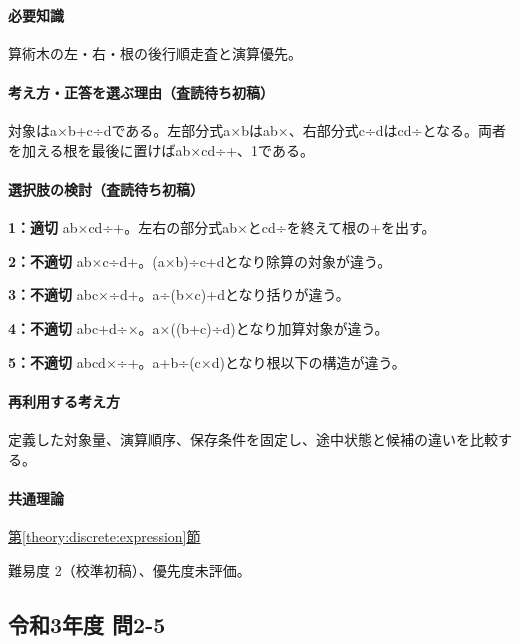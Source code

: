 \paragraph{必要知識} 算術木の左・右・根の後行順走査と演算優先。

\paragraph{考え方・正答を選ぶ理由（査読待ち初稿）} 対象はa×b+c÷dである。左部分式a×bはab×、右部分式c÷dはcd÷となる。両者を加える根を最後に置けばab×cd÷+、1である。

\paragraph{選択肢の検討（査読待ち初稿）}\mbox{}\par

\noindent\textbf{1：適切} ab×cd÷+。左右の部分式ab×とcd÷を終えて根の+を出す。\par

\noindent\textbf{2：不適切} ab×c÷d+。(a×b)÷c+dとなり除算の対象が違う。\par

\noindent\textbf{3：不適切} abc×÷d+。a÷(b×c)+dとなり括りが違う。\par

\noindent\textbf{4：不適切} abc+d÷×。a×((b+c)÷d)となり加算対象が違う。\par

\noindent\textbf{5：不適切} abcd×÷+。a+b÷(c×d)となり根以下の構造が違う。\par

\paragraph{再利用する考え方} 定義した対象量、演算順序、保存条件を固定し、途中状態と候補の違いを比較する。

\paragraph{共通理論} \hyperref[theory:discrete:expression]{第\ref*{theory:discrete:expression}節}

\par 難易度 2（校準初稿）、優先度未評価。

\subsection{令和3年度 問2-5}
\label{q:r03-reg-basic-2-5}

